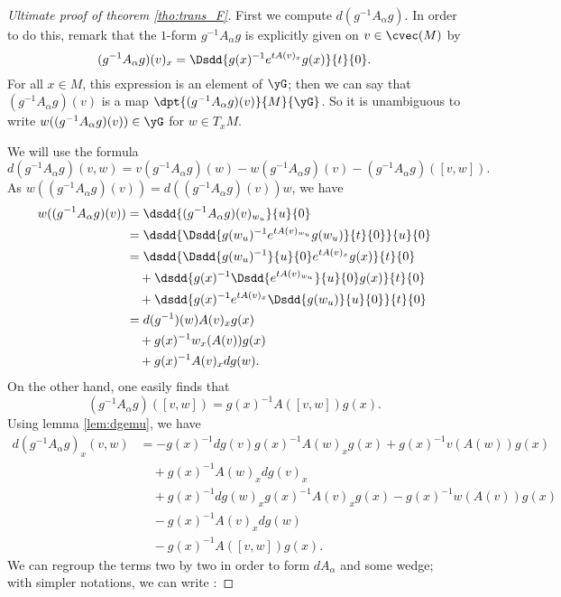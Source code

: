 \begin{proof}[Ultimate proof of theorem \ref{tho:trans_F}]
First we compute $d(g^{-1} A_{\alpha} g)$. In order to do this, remark that the $1$-form $g^{-1} A_{\alpha} g$ is explicitly given on $v\in\cvec(M)$ by
\[
   (g^{-1} A_{\alpha} g)(v)_x=\Dsdd{g(x)^{-1} e^{tA(v)_x}g(x)}{t}{0}.
\]
For all $x\in M$, this expression is an element of $\yG$; then we can say that $(g^{-1} A_{\alpha} g)(v)$ is a map $\dpt{(g^{-1} A_{\alpha} g)(v)}{M}{\yG}$. So it is unambiguous to write $w((g^{-1} A_{\alpha} g)(v))\in\yG$ for $w\in T_xM$.

We will use the formula
\[
   d(g^{-1} A_{\alpha} g)(v,w)=v(g^{-1} A_{\alpha} g)(w)-w(g^{-1} A_{\alpha} g)(v)-(g^{-1} A_{\alpha} g)([v,w]).
\]
As $w((g^{-1} A_{\alpha} g)(v))=d((g^{-1} A_{\alpha} g)(v))w$, we have
\begin{equation}
\begin{split}
    w((g^{-1} A_{\alpha} g)(v))&=\dsdd{(g^{-1} A_{\alpha} g)(v)_{w_u}}{u}{0}\\
                &=\dsdd{ \Dsdd{g(w_u)^{-1} e^{tA(v)_{w_u}}g(w_u)}{t}{0}  }{u}{0}\\
		&=\dsdd{  \Dsdd{g(w_u)^{-1}}{u}{0} e^{tA(v)_x}g(x)  }{t}{0}\\
		&\quad+\dsdd{ g(x)^{-1} \Dsdd{e^{tA(v)_{w_u}}}{u}{0} g(x)  }{t}{0}\\
		&\quad+\dsdd{  g(x)^{-1} e^{tA(v)_x} \Dsdd{g(w_u)}{u}{0}  }{t}{0}\\
		&=d(g^{-1})(w)A(v)_xg(x)\\
		&\quad+g(x)^{-1} w_x(A(v))g(x)\\
		&\quad+g(x)^{-1} A(v)_x dg(w).
\end{split}
\end{equation}
On the other hand, one easily finds that
\[
     (g^{-1} A_{\alpha} g)([v,w])=g(x)^{-1} A([v,w])g(x).
\]
 Using lemma \ref{lem:dgemu}, we have
\begin{equation}
\begin{split}
   d(g^{-1} A_{\alpha} g)_x(v,w)&=-g(x)^{-1} dg(v)g(x)^{-1} A(w)_xg(x)+g(x)^{-1} v(A(w))g(x)\\&\quad+g(x)^{-1} A(w)_xdg(v)_x\\
                   &\quad+g(x)^{-1} dg(w)_xg(x)^{-1} A(v)_xg(x)-g(x)^{-1} w(A(v))g(x)\\&\quad-g(x)^{-1} A(v)_xdg(w)\\
		   &\quad-g(x)^{-1} A([v,w])g(x).
\end{split}
\end{equation}
We can regroup the terms two by two in order to form $dA_{\alpha}$ and some wedge; with simpler notations, we can write :

\end{proof}
